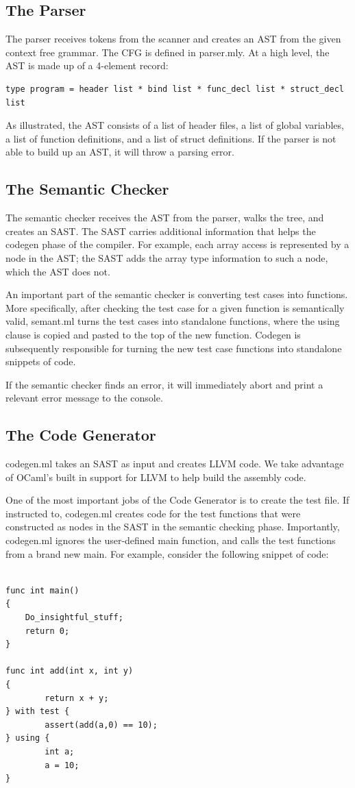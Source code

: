 \documentclass{article}
\begin{document}
\subsection{The Parser}
The parser receives tokens from the scanner and creates an AST from the given context free grammar. The CFG is defined in parser.mly. At a high level, the AST is made up of a 4-element record: \\
\begin{lstlisting}
type program = header list * bind list * func_decl list * struct_decl list
\end{lstlisting}
As illustrated, the AST consists of a list of header files, a list of global variables, a list of function definitions, and a list of struct definitions. If the parser is not able to build up an AST, it will throw a parsing error.
\subsection{The Semantic Checker}
The semantic checker receives the AST from the parser, walks the tree, and creates an SAST. The SAST carries additional information that helps the codegen phase of the compiler. For example, each array access is represented by a node in the AST; the SAST adds the array type information to such a node, which the AST does not.
\par
An important part of the semantic checker is converting test cases into functions. More specifically, after checking the test case for a given function is semantically valid, semant.ml turns the test cases into standalone functions, where the using clause is copied and pasted to the top of the new function. Codegen is subsequently responsible for turning the new test case functions into standalone snippets of code.  
\par
If the semantic checker finds an error, it will immediately abort and print a relevant error message to the console. 
\subsection{The Code Generator}
codegen.ml takes an SAST as input and creates LLVM code. We take advantage of OCaml's built in support for LLVM to help build the assembly code. 
\par
One of the most important jobs of the Code Generator is to create the test file. If instructed to, codegen.ml creates code for the test functions that were constructed as nodes in the SAST in the semantic checking phase. Importantly, codegen.ml ignores the user-defined main function, and calls the test functions from a brand new main. For example, consider the following snippet of code:
\begin{lstlisting}

func int main()
{
    Do_insightful_stuff;
    return 0;
}

func int add(int x, int y)
{
        return x + y;
} with test {
        assert(add(a,0) == 10);
} using {
        int a;
        a = 10;
}
\end{lstlisting}
\end{document}

